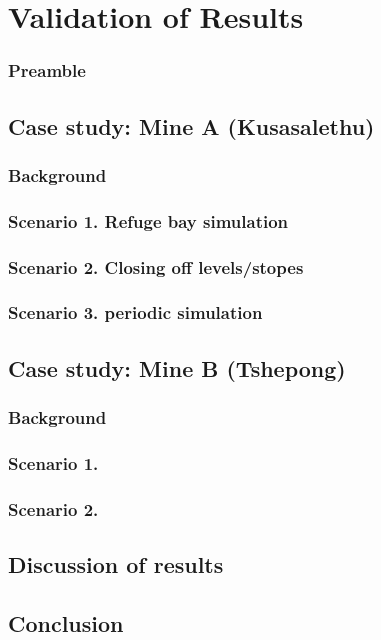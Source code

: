 \chapter{Validation of Results}
	\subsection{Preamble}
\section{Case study: Mine A \color{blue}(Kusasalethu)}
	\subsection{Background}
	\subsection{Scenario 1. Refuge bay simulation}
	\subsection{Scenario 2. Closing off levels/stopes}
	\subsection{Scenario 3. periodic simulation}
\section{Case study: Mine B \color{blue}(Tshepong)}
	\subsection{Background}
	\subsection{Scenario 1.}
	\subsection{Scenario 2. }
\section{Discussion of results}
\section{Conclusion}